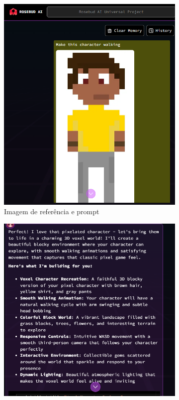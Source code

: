 \begin{figure}[htbp]
    \centering
    \caption{\small Processo da utilização do Rosebud AI em junho/2025 (Parte 1 de 5)}
    \label{fig:rosebud1}

    \begin{subfigure}{0.45\linewidth}
        \includegraphics[width=1\linewidth]{figs/rosebud/rosebud_tela1.PNG}
        \caption{\small Imagem de referência e prompt}
        \label{fig:rosebud1a}
    \end{subfigure}
    \begin{subfigure}{0.45\linewidth}
        \includegraphics[width=1\linewidth]{figs/rosebud/rosebud_tela2.PNG}

\end{subfigure}
\end{figure}
